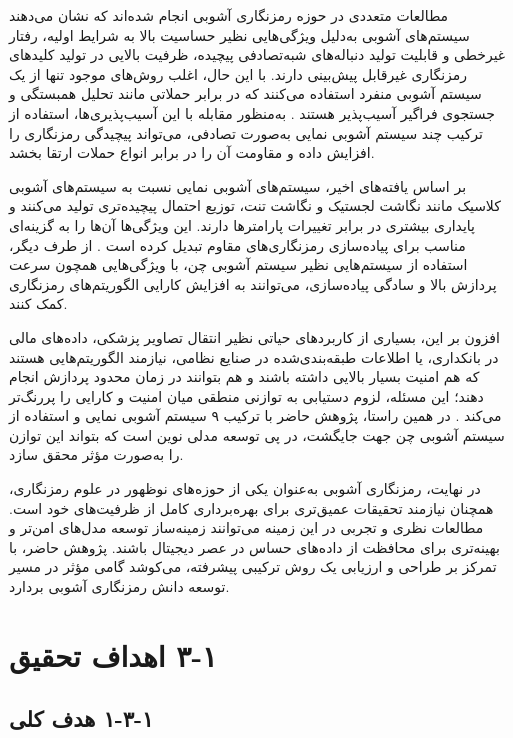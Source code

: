 مطالعات متعددی در حوزه رمزنگاری آشوبی انجام شده‌اند که نشان می‌دهند سیستم‌های آشوبی به‌دلیل ویژگی‌هایی نظیر حساسیت بالا به شرایط اولیه، رفتار غیرخطی و قابلیت تولید دنباله‌های شبه‌تصادفی پیچیده، ظرفیت بالایی در تولید کلیدهای رمزنگاری غیرقابل پیش‌بینی دارند. با این حال، اغلب روش‌های موجود تنها از یک سیستم آشوبی منفرد استفاده می‌کنند که در برابر حملاتی مانند تحلیل همبستگی و جستجوی فراگیر آسیب‌پذیر هستند \cite{ref12}.  به‌منظور مقابله با این آسیب‌پذیری‌ها، استفاده از ترکیب چند سیستم آشوبی نمایی به‌صورت تصادفی، می‌تواند پیچیدگی رمزنگاری را افزایش داده و مقاومت آن را در برابر انواع حملات ارتقا بخشد.

بر اساس یافته‌های اخیر، سیستم‌های آشوبی نمایی نسبت به سیستم‌های آشوبی کلاسیک مانند نگاشت لجستیک و نگاشت تنت، توزیع احتمال پیچیده‌تری تولید می‌کنند و پایداری بیشتری در برابر تغییرات پارامترها دارند. این ویژگی‌ها آن‌ها را به گزینه‌ای مناسب برای پیاده‌سازی رمزنگاری‌های مقاوم تبدیل کرده است \cite{ref5}. از طرف دیگر، استفاده از سیستم‌هایی نظیر سیستم آشوبی چن، با ویژگی‌هایی همچون سرعت پردازش بالا و سادگی پیاده‌سازی، می‌توانند به افزایش کارایی الگوریتم‌های رمزنگاری کمک کنند.

افزون بر این، بسیاری از کاربردهای حیاتی نظیر انتقال تصاویر پزشکی، داده‌های مالی در بانکداری، یا اطلاعات طبقه‌بندی‌شده در صنایع نظامی، نیازمند الگوریتم‌هایی هستند که هم امنیت بسیار بالایی داشته باشند و هم بتوانند در زمان محدود پردازش انجام دهند؛ این مسئله، لزوم دستیابی به توازنی منطقی میان امنیت و کارایی را پررنگ‌تر می‌کند \cite{ref5}. در همین راستا، پژوهش حاضر با ترکیب ۹ سیستم آشوبی نمایی و استفاده از سیستم آشوبی چن جهت جایگشت، در پی توسعه مدلی نوین است که بتواند این توازن را به‌صورت مؤثر محقق سازد.

در نهایت، رمزنگاری آشوبی به‌عنوان یکی از حوزه‌های نوظهور در علوم رمزنگاری، همچنان نیازمند تحقیقات عمیق‌تری برای بهره‌برداری کامل از ظرفیت‌های خود است. مطالعات نظری و تجربی در این زمینه می‌توانند زمینه‌ساز توسعه مدل‌های امن‌تر و بهینه‌تری برای محافظت از داده‌های حساس در عصر دیجیتال باشند. پژوهش حاضر، با تمرکز بر طراحی و ارزیابی یک روش ترکیبی پیشرفته، می‌کوشد گامی مؤثر در مسیر توسعه دانش رمزنگاری آشوبی بردارد.

\section{‏۱‏-‏۳‏ اهداف تحقيق}

\subsection{‏۱‏-‏۳‏-‏۱‏ هدف کلی}

